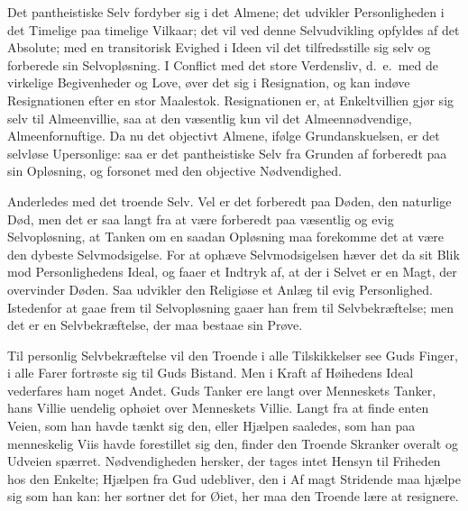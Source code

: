 \documentclass[12pt]{book}
\begin{document}
Det pantheistiske Selv fordyber sig i det Almene; det udvikler
Personligheden i det Timelige paa timelige Vilkaar; det vil ved
denne Selvudvikling opfyldes af det
Absolute; med en transitorisk Evighed i Ideen vil det tilfredsstille
sig selv og forberede sin Selvopløsning. I Conflict med det store
Verdensliv, d.\ e.\ med de virkelige Begivenheder og Love, øver det
sig i Resignation, og kan indøve Resignationen efter en stor
Maalestok. Resignationen er, at Enkeltvillien gjør sig selv til
Almeenvillie, saa at den væsentlig kun vil det Almeennødvendige,
Almeenfornuftige. Da nu det objectivt Almene, ifølge
Grundanskuelsen, er det selvløse Upersonlige: saa er det
pantheistiske Selv fra Grunden af forberedt paa sin Opløsning, og
forsonet med den objective Nødvendighed.

Anderledes med det troende Selv. Vel er det forberedt paa Døden, den
naturlige Død, men det er saa langt fra at være forberedt paa
væsentlig og evig Selvopløsning, at Tanken om en saadan Opløsning
maa forekomme det at være den dybeste Selvmodsigelse. For at ophæve
Selvmodsigelsen hæver det da sit Blik mod Personlighedens Ideal, og
faaer et Indtryk af, at der i Selvet er en Magt, der overvinder
Døden. Saa udvikler den Religiøse et Anlæg til evig Personlighed.
Istedenfor at gaae frem til Selvopløsning gaaer han frem til
Selvbekræftelse; men det er en Selvbekræftelse, der maa bestaae sin
Prøve.

Til personlig Selvbekræftelse vil den Troende i alle Tilskikkelser
see Guds Finger, i alle Farer fortrøste sig til Guds Bistand. Men i
Kraft af Høihedens Ideal vederfares ham noget Andet. Guds Tanker ere
langt over Menneskets Tanker, hans Villie uendelig ophøiet over
Menneskets Villie. Langt fra at finde enten Veien, som han havde
tænkt sig den, eller Hjælpen saaledes, som han paa menneskelig Viis
havde forestillet sig den, finder den Troende Skranker overalt og
Udveien spærret. Nødvendigheden hersker, der tages intet Hensyn til
Friheden hos den Enkelte; Hjælpen fra Gud udebliver, den i Af\-
magt Stridende maa hjælpe sig som han kan: her sortner det for
Øiet, her maa den Troende lære at resignere.
\end{document}
